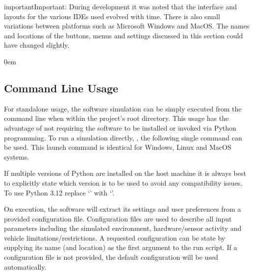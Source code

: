 \documentclass[letterpaper,10pt,english]{sphinxmanual}
\let\sphinxpxdimen\pdfpxdimen\else\newdimen\sphinxpxdimen
\begin{document}
\begin{sphinxadmonition}{important}{Important:}
\sphinxAtStartPar
During development it was noted that the interface and layouts for the various IDEs used evolved with
time. There is also small variations between platforms such as Microsoft Windows and MacOS. The names and
locations of the buttons, menus and settings discussed in this section could have changed slightly.
\end{sphinxadmonition}

\begin{DUlineblock}{0em}
\item[] 
\end{DUlineblock}


\subsection{Command Line Usage}
\label{\detokenize{usage/execution:command-line-usage}}
\noindent{\hspace*{\fill}\sphinxincludegraphics[width=105\sphinxpxdimen]{{terminal_icon}.png}\hspace*{\fill}}

\sphinxAtStartPar
For standalone usage, the software simulation can be simply executed from the command line when within the project’s
root directory. This usage has the advantage of not requiring the software to be installed or invoked via
Python programming. To run a simulation directly, , the following single
command can be used. This launch command is identical for Windows, Linux and MacOS systems.
\def\sphinxLiteralBlockLabel{\label{\detokenize{usage/execution:id3}}}
\begin{sphinxVerbatim}[commandchars=\\\{\}]
 
\end{sphinxVerbatim}

\sphinxAtStartPar
If multiple versions of Python are installed on the host machine it is always best to explicitly state which version
is to be used to avoid any compatibility issues. To use Python 3.12 replace ‘’ with ‘’.

\sphinxAtStartPar
On execution, the software will extract its settings and user preferences from a provided configuration file.
Configuration files are used to describe all input parameters including the simulated environment, hardware/sensor
activity and vehicle limitations/restrictions. A requested configuration can be state by supplying its name (and
location) as the first argument to the run script. If a configuration file is not provided, the default
configuration  will be used automatically.
\end{document}
